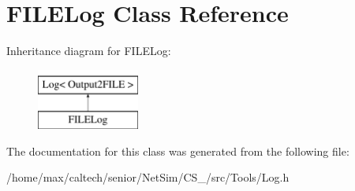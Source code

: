 \hypertarget{classFILELog}{\section{\-F\-I\-L\-E\-Log \-Class \-Reference}
\label{classFILELog}
}
\-Inheritance diagram for \-F\-I\-L\-E\-Log\-:\begin{figure}[H]
\begin{center}
\leavevmode
\includegraphics[height=2.000000cm]{classFILELog}
\end{center}
\end{figure}


\-The documentation for this class was generated from the following file\-:\begin{DoxyCompactItemize}
\item 
/home/max/caltech/senior/\-Net\-Sim/\-C\-S\-\_/src/\-Tools/\-Log.\-h\end{DoxyCompactItemize}
